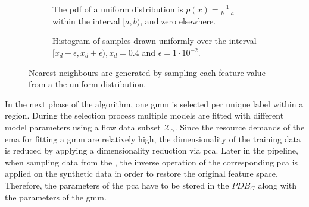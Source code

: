 \documentclass[../../main.tex]{subfiles}
\begin{document}
 \begin{figure}[t!]%
    \centering%
    \begin{subfigure}[b!]{0.49\textwidth}%
        \centering\captionsetup{width=.8\linewidth}%
        \caption{The pdf of a uniform distribution is $p(x) = \frac{1}{b-a}$ within the interval $[a, b)$, and zero elsewhere.}%
        \label{subfig:uniform_dist}%
    \end{subfigure}%
    \hfill%
    \begin{subfigure}[b!]{0.49\textwidth}%
        \centering\captionsetup{width=.8\linewidth}%
        \caption{Histogram of  samples drawn uniformly over the interval $[x_d-\epsilon, x_d+\epsilon), x_d=0.4$ and $\epsilon=1 \cdot 10^{-2}$.}%
        \label{subfig:hist_nn}%
    \end{subfigure}%
    \caption[Nearest neighbour feature generation]{Nearest neighbours are generated by sampling each feature value from a the uniform distribution.}%
    \label{fig:uniform_dist_nn}%
\end{figure}%

 In the next phase of the algorithm, one \acrshort{gmm} is selected per unique label within a region. During the selection process multiple models are fitted with different model parameters using a flow data subset $\mathcal{X}_\alpha$. Since the resource demands of the \gls{ema} for fitting a \acrshort{gmm} are relatively high, the dimensionality of the training data is reduced by applying a dimensionality reduction via \gls{pca}. Later in the pipeline, when sampling data from the , the inverse operation of the corresponding \gls{pca} is applied on the synthetic data in order to restore the original feature space. Therefore, the parameters of the \gls{pca} have to be stored in the $PDB_G$ along with the parameters of the \gls{gmm}.
 
\end{document}
